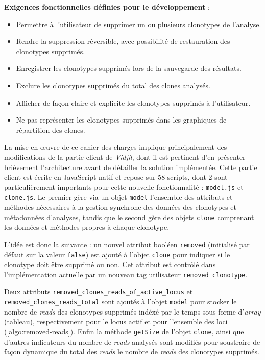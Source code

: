\textbf{Exigences fonctionnelles définies pour le développement} :
\begin{itemize}
    \item Permettre à l'utilisateur de supprimer un ou plusieurs clonotypes de
          l'analyse.
    \item Rendre la suppression réversible, avec possibilité de restauration
          des clonotypes supprimés.
    \item Enregistrer les clonotypes supprimés lors de la sauvegarde des
          résultats.
    \item Exclure les clonotypes supprimés du total des clones analysés.
    \item Afficher de façon claire et explicite les clonotypes supprimés à
          l'utilisateur.
    \item Ne pas représenter les clonotypes supprimés dans les graphiques de
          répartition des clones.
\end{itemize}

\vspace{1em}

La mise en œuvre de ce cahier des charges implique principalement des
modifications de la partie client de \textit{Vidjil}, dont il est pertinent
d'en présenter brièvement l'architecture avant de détailler la solution
implémentée. Cette partie client est écrite en JavaScript natif et repose sur
58 scripts, dont 2 sont particulièrement importants pour cette nouvelle
fonctionnalité : \texttt{model.js} et \texttt{clone.js}. Le premier gère via un
objet \texttt{model} l'ensemble des attributs et méthodes nécessaires à la
gestion synchrone des données des clonotypes et métadonnées d'analyses, tandis
que le second gère des objets \texttt{clone} comprenant les données et méthodes
propres à chaque clonotype.

L'idée est donc la suivante : un nouvel attribut booléen \texttt{removed}
(initialisé par défaut sur la valeur \texttt{false}) est ajouté à l'objet
\texttt{clone} pour indiquer si le clonotype doit être supprimé ou non. Cet
attribut est contrôlé dans l'implémentation actuelle par un nouveau tag
utilisateur \texttt{removed\ clonotype}. 

Deux attributs \texttt{removed\_clones\_reads\_of\_active\_locus} et
\texttt{removed\_clones\_reads\_total} sont ajoutés à l'objet \texttt{model}
pour stocker le nombre de \textit{reads} des clonotypes supprimés indéxé par le
temps sous forme d'\textit{array} (tableau), respectivement pour le locus actif
et pour l'ensemble des loci (\autoref{algo:removed-reads}). Enfin la méthode
\texttt{getSize} de l'objet \texttt{clone}, ainsi que d'autres indicateurs du
nombre de \textit{reads} analysés sont modifiés pour soustraire de façon dynamique
du total des \textit{reads} le nombre de \textit{reads} des clonotypes supprimés.

